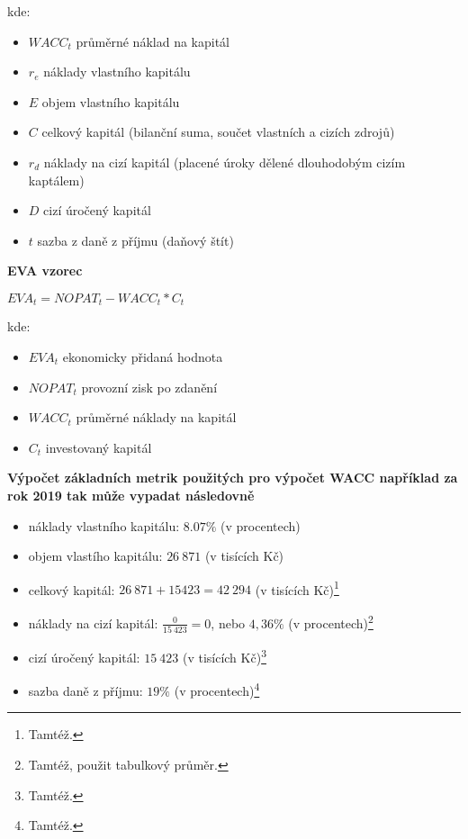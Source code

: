 kde:\\

\begin{itemize}
	\item $WACC_t$ průměrné náklad na kapitál
	\item $r_e$ náklady vlastního kapitálu
	\item $E$ objem vlastního kapitálu
	\item $C$ celkový kapitál (bilanční suma, součet vlastních a cizích zdrojů)
	\item $r_d$ náklady na cizí kapitál (placené úroky dělené dlouhodobým cizím kaptálem)
	\item $D$ cizí úročený kapitál
	\item $t$ sazba z daně z příjmu (daňový štít)
\end{itemize}

\noindent\textbf{EVA vzorec}\\

\begin{center}
$EVA_t = NOPAT_t - WACC_t * C_t$\\
\end{center}

kde:\\

\begin{itemize}
	\item $EVA_t$ ekonomicky přidaná hodnota
	\item $NOPAT_t$ provozní zisk po zdanění
	\item $WACC_t$ průměrné náklady na kapitál
	\item $C_t$ investovaný kapitál
\end{itemize}

\newpage


\noindent\textbf{Výpočet základních metrik použitých pro výpočet WACC například za rok 2019 tak může vypadat následovně}

\begin{itemize}
	\item náklady vlastního kapitálu: $8.07\%$ (v procentech)%
	\item objem vlastího kapitálu: $26\ 871$ (v tisících Kč)
	\item celkový kapitál: $26\ 871 + 15 423 = 42\ 294$ (v tisících Kč)\footnote{Tamtéž.}
	\item náklady na cizí kapitál: $\frac{0}{15\ 423} = 0$, nebo $4,36\%$ (v procentech)\footnote{Tamtéž, použit tabulkový průměr.}
	\item cizí úročený kapitál: $15\ 423$ (v tisících Kč)\footnote{Tamtéž.}
	\item sazba daně z příjmu: $19\%$ (v procentech)\footnote{Tamtéž.}
\end{itemize}

